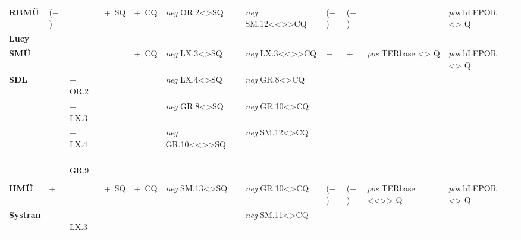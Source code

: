 \begin{sidewaystable}
{\begin{tabular}{lllllllllll}
\midrule
{\textbf{RBMÜ}} & {($-$)} & \cellcolor{smGreen}{$-$ OR.2}  & {+~SQ} & +~CQ & \cellcolor{smGreen}\textit{neg} OR.2<>SQ & \cellcolor{smGreen}\textit{neg} SM.12<{}<{}>{}>CQ & {($-$)} & {($-$)} & \cellcolor{smGreen}{\textit{pos} TERbase <> Q} & \cellcolor{smGreen}\textit{pos} hLEPOR <> Q\\
\textbf{Lucy}& &\cellcolor{smGreen}{$-$ SM.13} & & & \cellcolor{smGreen} & \cellcolor{smGreen} & & &  \cellcolor{smGreen} & \cellcolor{smGreen} \\
\midrule
{\textbf{SMÜ}} & \cellcolor{smGreen}{($-$)} & \cellcolor{smGreen}{+~OR.1} &  \cellcolor{smGreen}{+~SQ} & \cellcolor{smGreen}+~CQ & \cellcolor{smGreen}\textit{neg} LX.3<>SQ & \cellcolor{smGreen}\textit{neg} LX.3<{}<{}>{}>CQ & {+} & {+} & \cellcolor{smGreen}\textit{pos} TERbase <> Q & \cellcolor{smGreen}\textit{pos} hLEPOR <> Q \\
\textbf{SDL}& \cellcolor{smGreen} & \cellcolor{smGreen}$-$ OR.2  &\cellcolor{smGreen} & \cellcolor{smGreen} & \cellcolor{smGreen}\textit{neg} LX.4<>SQ & \cellcolor{smGreen}\textit{neg} GR.8<>CQ &  &  & \cellcolor{smGreen} & \cellcolor{smGreen} \\
& \cellcolor{smGreen} & \cellcolor{smGreen}$-$ LX.3 & \cellcolor{smGreen} & \cellcolor{smGreen} & \cellcolor{smGreen}\textit{neg} GR.8<>SQ & \cellcolor{smGreen}\textit{neg} GR.10<>CQ &  &  & \cellcolor{smGreen} & \cellcolor{smGreen}\\
& \cellcolor{smGreen} & \cellcolor{smGreen}$-$ LX.4 & \cellcolor{smGreen} & \cellcolor{smGreen} & \cellcolor{smGreen}\textit{neg} GR.10<{}<{}>{}>SQ & \cellcolor{smGreen}\textit{neg} SM.12<>CQ &  &  & \cellcolor{smGreen} & \cellcolor{smGreen}\\
& \cellcolor{smGreen} & \cellcolor{smGreen}$-$ GR.9 & \cellcolor{smGreen} & \cellcolor{smGreen} & \cellcolor{smGreen} & \cellcolor{smGreen} & & & \cellcolor{smGreen} & \cellcolor{smGreen}\\
& \cellcolor{smGreen} & \cellcolor{smGreen}{$-$ GR.10} & \cellcolor{smGreen} & \cellcolor{smGreen} & \cellcolor{smGreen} & \cellcolor{smGreen} & & & \cellcolor{smGreen} & \cellcolor{smGreen}\\
\midrule
{\textbf{HMÜ}} & {+} & \cellcolor{smGreen}{+~OR.1} &  {+~SQ} & +~CQ & \cellcolor{smGreen}\textit{neg} SM.13<>SQ & \cellcolor{smGreen}\textit{neg} GR.10<>CQ & {($-$)} & {($-$)} & \cellcolor{smGreen}\textit{pos} TERbase <{}<{}>{}> Q & \cellcolor{smGreen}\textit{pos} hLEPOR <> Q\\
\textbf{Systran}& &\cellcolor{smGreen}$-$ LX.3 &  &  & \cellcolor{smGreen} &  \cellcolor{smGreen}\textit{neg} SM.11<>CQ &  &  & \cellcolor{smGreen} & \cellcolor{smGreen}\\

\end{tabular}}
\end{sidewaystable}
